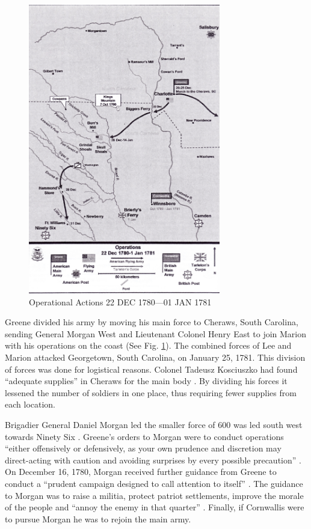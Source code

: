 \begin{figure}[h]
\begin{center}
\includegraphics[height=5in]{gfx/Nicholson4}
\end{center}
\caption{Operational Actions 22 DEC 1780---01 JAN 1781 \cite[Tab D, Map 6]{rauch_battle_2007}}
\label{Nicholson4}
\end{figure}

Greene divided his army by moving his main force to Cheraws, South Carolina,
sending General Morgan West and Lieutenant Colonel Henry East to join Marion
with his operations on the coast (See Fig. \ref{Nicholson4}).  The combined
forces of Lee and Marion attacked Georgetown, South Carolina, on January 25,
1781.  This division of forces was done for logistical reasons.  Colonel Tadeusz
Kosciuszko had found “adequate supplies” in Cheraws for the main body
\cite[p.23]{moncure_cowpens_1996}.  By dividing his forces it lessened the number of soldiers
in one place, thus requiring fewer supplies from each location.  

Brigadier General Daniel Morgan led the smaller force of 600 was led south west
towards Ninety Six \cite[p.27]{weigley_partisan_1970}.  Greene’s orders to Morgan were to
conduct operations “either offensively or defensively, as your own prudence and
discretion may direct-acting with caution and avoiding surprises by every
possible precaution” \cite[p.27]{weigley_partisan_1970}.  On December 16, 1780, Morgan
received further guidance from Greene to conduct a “prudent campaign designed to
call attention to itself” \cite[p.24]{moncure_cowpens_1996}.  The guidance to Morgan was to
raise a militia, protect patriot settlements, improve the morale of the people
and “annoy the enemy in that quarter” \cite[p.24]{moncure_cowpens_1996}.  Finally, if
Cornwallis were to pursue Morgan he was to rejoin the main army.  

